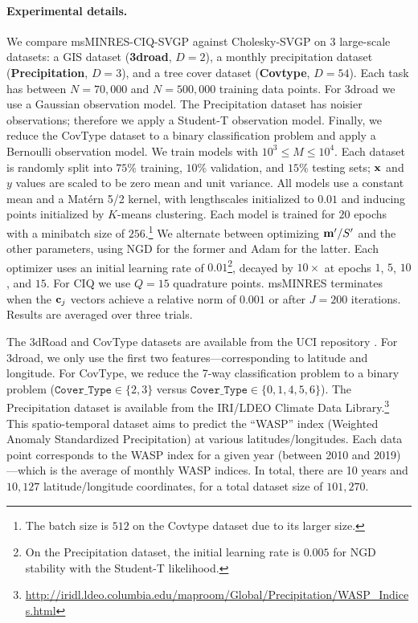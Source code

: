 \paragraph{Experimental details.}
We compare msMINRES-CIQ-SVGP against Cholesky-SVGP on 3 large-scale datasets: a GIS dataset ({\bf 3droad}, $D=2$), a monthly precipitation dataset ({\bf Precipitation}, $D=3$), and a tree cover dataset ({\bf Covtype}, $D=54$).
Each task has between $N=70,\!000$ and $N=500,\!000$ training data points.
For 3droad we use a Gaussian observation model.
The Precipitation dataset has noisier observations; therefore we apply a Student-T observation model.
Finally, we reduce the CovType dataset to a binary classification problem and apply a Bernoulli observation model.
We train models with $ 10^3 \le M \le 10^4$.
Each dataset is randomly split into $75\%$ training, $10\%$ validation, and $15\%$ testing sets; $\mathbf{x}$ and $y$ values are scaled to be zero mean and unit variance.
All models use a constant mean and a Mat\'ern 5/2 kernel, with lengthscales initialized to $0.01$ and inducing points initialized by $K$-means clustering.
Each model is trained for $20$ epochs with a minibatch size of $256.$\footnote{
  The batch size is $512$ on the Covtype dataset due to its larger size.
}
We alternate between optimizing $\mathbf{m}'/S'$ and the other parameters, using NGD for the former and Adam \cite{kingma2014adam} for the latter.
Each optimizer uses an initial learning rate of $0.01$\footnote{
  On the Precipitation dataset, the initial learning rate is $0.005$ for NGD stability with the Student-T likelihood.
}, decayed by $10\times$ at epochs $1$, $5$, $10$, and $15$.
For CIQ we use $Q = 15$ quadrature points.
msMINRES terminates when the $\mathbf{c}_j$ vectors achieve a relative norm of $0.001$ or after $J=200$ iterations.
Results are averaged over three trials.

The 3dRoad and CovType datasets are available from the UCI repository \citep{asuncion2007uci}.
For 3droad, we only use the first two features---corresponding to latitude and longitude.
For CovType, we reduce the 7-way classification problem to a binary problem ($\mathtt{Cover\_Type} \in \{ 2, 3\}$ versus $\mathtt{Cover\_Type} \in \{ 0, 1, 4, 5, 6 \}$).
The Precipitation dataset is available from the IRI/LDEO Climate Data Library.\footnote{
  \url{http://iridl.ldeo.columbia.edu/maproom/Global/Precipitation/WASP_Indices.html}
}
This spatio-temporal dataset aims to predict the ``WASP'' index (Weighted Anomaly Standardized Precipitation) at various latitudes/longitudes.
Each data point corresponds to the WASP index for a given year (between 2010 and 2019)---which is the average of monthly WASP indices.
In total, there are 10 years and $10,\!127$ latitude/longitude coordinates, for a total dataset size of $101,\!270$.

